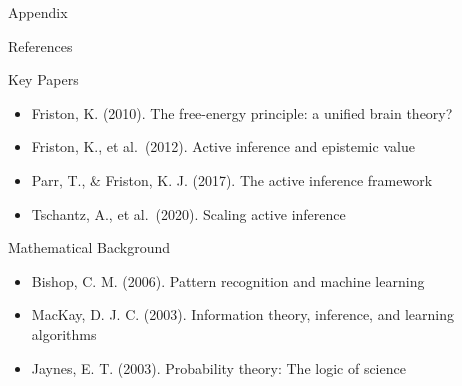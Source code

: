 \documentclass[
  ignorenonframetext,
]{beamer}
\providecommand{\tightlist}{%
  \setlength{\itemsep}{0pt}\setlength{\parskip}{0pt}}
\begin{document}
\begin{frame}[fragile]{Appendix}
\begin{block}{References}
\protect{}\label{sec:references_appendix}
\begin{block}{Key Papers}
\protect{}\label{key-papers}
\begin{itemize}
\tightlist
\item
  Friston, K. (2010). The free-energy principle: a unified brain theory?
\item
  Friston, K., et al.~(2012). Active inference and epistemic value
\item
  Parr, T., \& Friston, K. J. (2017). The active inference framework
\item
  Tschantz, A., et al.~(2020). Scaling active inference
\end{itemize}
\end{block}

\begin{block}{Mathematical Background}
\protect{}\label{mathematical-background}
\begin{itemize}
\tightlist
\item
  Bishop, C. M. (2006). Pattern recognition and machine learning
\item
  MacKay, D. J. C. (2003). Information theory, inference, and learning
  algorithms
\item
  Jaynes, E. T. (2003). Probability theory: The logic of science
\end{itemize}
\end{block}
\end{block}
\end{frame}
\end{document}
